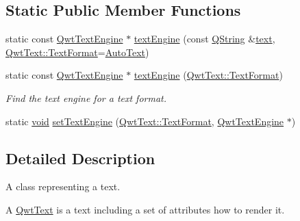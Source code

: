 \subsection*{Static Public Member Functions}
\begin{DoxyCompactItemize}
\item 
static const \hyperlink{class_qwt_text_engine}{Qwt\-Text\-Engine} $\ast$ \hyperlink{class_qwt_text_a053d8fdb4de77bd3b6f2eb0ecd3980ca}{text\-Engine} (const \hyperlink{group___u_a_v_objects_plugin_gab9d252f49c333c94a72f97ce3105a32d}{Q\-String} \&\hyperlink{class_qwt_text_a15a42a83153f82bab8cfc283d090d736}{text}, \hyperlink{class_qwt_text_a63e0d6a59a427a37ed0bfa71b782fd76}{Qwt\-Text\-::\-Text\-Format}=\hyperlink{class_qwt_text_a63e0d6a59a427a37ed0bfa71b782fd76a0645d333081ec9e3574c98f510c284a1}{Auto\-Text})
\item 
static const \hyperlink{class_qwt_text_engine}{Qwt\-Text\-Engine} $\ast$ \hyperlink{class_qwt_text_a2828c4976bd30572d236811bc30037be}{text\-Engine} (\hyperlink{class_qwt_text_a63e0d6a59a427a37ed0bfa71b782fd76}{Qwt\-Text\-::\-Text\-Format})
\begin{DoxyCompactList}\small\item\em Find the text engine for a text format. \end{DoxyCompactList}\item 
static \hyperlink{group___u_a_v_objects_plugin_ga444cf2ff3f0ecbe028adce838d373f5c}{void} \hyperlink{class_qwt_text_aef6a1e71b1feba3116ce69f6c9de70ad}{set\-Text\-Engine} (\hyperlink{class_qwt_text_a63e0d6a59a427a37ed0bfa71b782fd76}{Qwt\-Text\-::\-Text\-Format}, \hyperlink{class_qwt_text_engine}{Qwt\-Text\-Engine} $\ast$)
\end{DoxyCompactItemize}


\subsection{Detailed Description}
A class representing a text. 

A \hyperlink{class_qwt_text}{Qwt\-Text} is a text including a set of attributes how to render it.


